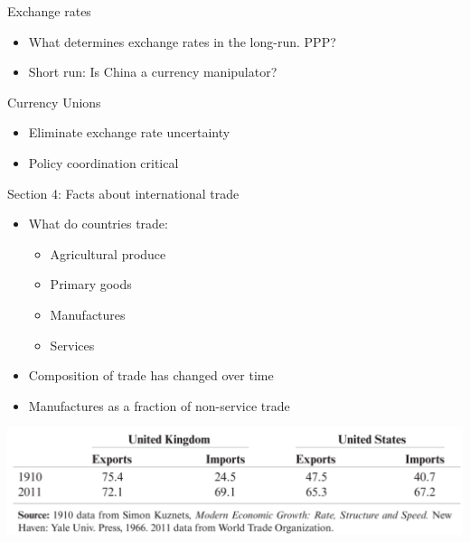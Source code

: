 \documentclass[ignorenonframetext,]{beamer}
\begin{document}
\begin{frame}{Exchange rates}

    \begin{itemize}
        \item What determines exchange rates in the long-run.  PPP?
        \item Short run: Is China a currency manipulator?
    \end{itemize}

\end{frame}

\begin{frame}{Currency Unions}

    \begin{itemize}
        \item Eliminate exchange rate uncertainty
        \item Policy coordination critical
    \end{itemize}

\end{frame}

\begin{frame}
    Section 4: Facts about international trade
\end{frame}

\begin{frame}

    \begin{itemize}
        \item What do countries trade:
        \begin{itemize}
            \item Agricultural produce
            \item Primary goods
            \item Manufactures
            \item Services
        \end{itemize}
        \item Composition of trade has changed over time
        \item Manufactures as a fraction of non-service trade
    \end{itemize}
    
    \includegraphics[scale=0.20]{us_uk_merchandise_trade.png}

\end{frame}
\end{document}
